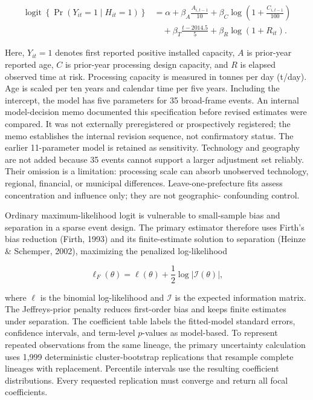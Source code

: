 \documentclass[12pt,a4paper]{article}
\begin{document}
\begin{equation}
\begin{aligned}
\operatorname{logit}\!\left\{\Pr(Y_{it}=1\mid H_{it}=1)\right\}
&=\alpha+\beta_A\frac{A_{i,t-1}}{10}
+\beta_C\log\!\left(1+\frac{C_{i,t-1}}{100}\right) \\
&\quad+\beta_T\frac{t-2014.5}{5}
+\beta_R\log(1+R_{it}).
\end{aligned}
\label{eq:entry-model}
\end{equation}

Here, $Y_{it}=1$ denotes first reported positive installed capacity, $A$ is
prior-year reported age, $C$ is prior-year processing design capacity, and
$R$ is elapsed observed time at risk. Processing capacity is measured in tonnes
per day (t/day). Age is scaled per ten years and calendar time per five years.
Including the intercept, the model has five
parameters for 35 broad-frame events. An internal model-decision memo documented
this specification before revised estimates were compared. It was not externally
preregistered or prospectively registered; the memo establishes the internal
revision sequence, not confirmatory status. The earlier 11-parameter model is retained as sensitivity.
Technology and geography
are not added because 35 events cannot support a larger adjustment set reliably.
Their omission is a limitation: processing scale can absorb unobserved
technology, regional, financial, or municipal differences. Leave-one-prefecture
fits assess concentration and influence only; they are not geographic-
confounding control.

Ordinary maximum-likelihood logit is vulnerable to small-sample bias and
separation in a sparse event design. The primary estimator therefore uses
Firth's bias reduction (Firth, 1993) and its finite-estimate solution to
separation (Heinze \& Schemper, 2002), maximizing the penalized log-likelihood

\begin{equation}
\ell_F(\theta)=
\ell(\theta)+
\frac{1}{2}\log\left|\mathcal{I}(\theta)\right|,
\label{eq:firth}
\end{equation}

where $\ell$ is the binomial log-likelihood and $\mathcal{I}$ is the expected
information matrix. The Jeffreys-prior penalty reduces first-order bias and
keeps finite estimates under separation. The coefficient table labels the
fitted-model standard errors, confidence intervals, and term-level $p$-values as
model-based. To represent repeated observations from the same lineage, the
primary uncertainty calculation uses 1,999 deterministic cluster-bootstrap
replications that resample complete lineages with replacement. Percentile
intervals use the resulting coefficient distributions. Every requested
replication must converge and return all focal coefficients.
\end{document}
